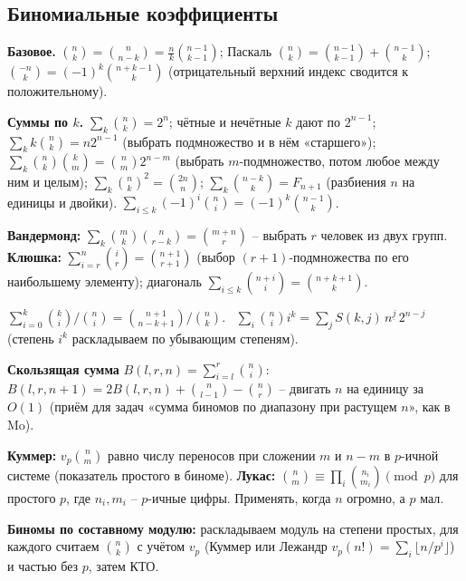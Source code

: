 \subsection{Биномиальные коэффициенты}
\textbf{Базовое.} $\binom nk=\binom n{n-k}=\frac nk\binom{n-1}{k-1}$; Паскаль $\binom nk=\binom{n-1}{k-1}+\binom{n-1}k$; $\binom{-n}{k}=(-1)^k\binom{n+k-1}k$ (отрицательный верхний индекс сводится к положительному).
\par \textbf{Суммы по $k$.} $\sum_k\binom nk=2^n$; чётные и нечётные $k$ дают по $2^{n-1}$; $\sum_k k\binom nk=n2^{n-1}$ (выбрать подмножество и в нём «старшего»); $\sum_k\binom nk\binom km=\binom nm2^{n-m}$ (выбрать $m$-подмножество, потом любое между ним и целым); $\sum_k\binom nk^2=\binom{2n}n$; $\sum_{k}\binom{n-k}k=F_{n+1}$ (разбиения $n$ на единицы и двойки). $\sum_{i\le k}(-1)^i\binom ni=(-1)^k\binom{n-1}k$.
\par \textbf{Вандермонд:} $\sum_k\binom mk\binom n{r-k}=\binom{m+n}r$ -- выбрать $r$ человек из двух групп. \textbf{Клюшка:} $\sum_{i=r}^n\binom ir=\binom{n+1}{r+1}$ (выбор $(r{+}1)$-подмножества по его наибольшему элементу); диагональ $\sum_{i\le k}\binom{n+i}i=\binom{n+k+1}k$.
\par $\sum_{i=0}^k\binom ki\big/\binom ni=\binom{n+1}{n-k+1}\big/\binom nk$. \ $\sum_i\binom ni i^k=\sum_jS(k,j)\,n^{\underline j}\,2^{n-j}$ (степень $i^k$ раскладываем по убывающим степеням).
\par \textbf{Скользящая сумма} $B(l,r,n)=\sum_{i=l}^r\binom ni$: $B(l,r,n{+}1)=2B(l,r,n)+\binom n{l-1}-\binom nr$ -- двигать $n$ на единицу за $O(1)$ (приём для задач «сумма биномов по диапазону при растущем $n$», как в Mo).
\par \textbf{Куммер:} $v_p\binom nm$ равно числу переносов при сложении $m$ и $n-m$ в $p$-ичной системе (показатель простого в биноме). \textbf{Лукас:} $\binom nm\equiv\prod_i\binom{n_i}{m_i}\pmod p$ для простого $p$, где $n_i,m_i$ -- $p$-ичные цифры. Применять, когда $n$ огромно, а $p$ мал.
\par \textbf{Биномы по составному модулю:} раскладываем модуль на степени простых, для каждого считаем $\binom nk$ с учётом $v_p$ (Куммер или Лежандр $v_p(n!)=\sum_i\lfloor n/p^i\rfloor$) и частью без $p$, затем КТО.
